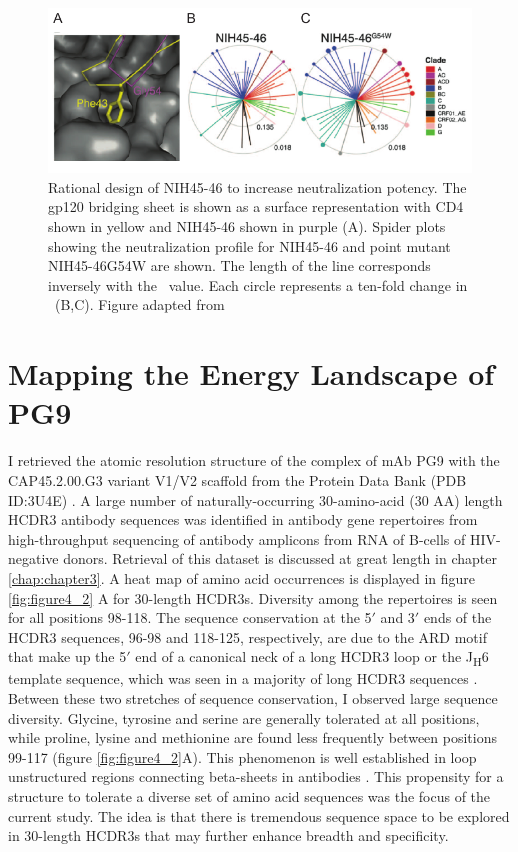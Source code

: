\begin{figure}
   \centering
   \includegraphics{images/chapter4/figure4_1.pdf} %
   \caption[Rational Design of NIH45-46 to Increase Neutralization Potency]{Rational design of NIH45-46 to increase neutralization potency. The gp120 bridging sheet is shown as a surface representation with CD4 shown in yellow and NIH45-46 shown in purple (A). Spider plots showing the neutralization profile for NIH45-46 and point mutant NIH45-46G54W are shown. The length of the line corresponds inversely with the \ic~value. Each circle represents a ten-fold change in \ic~(B,C). Figure adapted from \citep{Diskin:2011hl}}
   \label{fig:figure4_1}
\end{figure}

\section{Mapping the Energy Landscape of PG9}
\label{sec:mapping}
I retrieved the atomic resolution structure of the complex of mAb PG9 with the CAP45.2.00.G3 variant V1/V2 scaffold from the Protein Data Bank (PDB ID:3U4E) \citep{McLellan:2011dg}. A large number of naturally-occurring 30-amino-acid (30 AA) length HCDR3 antibody sequences was identified in antibody gene repertoires from high-throughput sequencing of antibody amplicons from RNA of B-cells of HIV-negative donors. Retrieval of this dataset is discussed at great length in chapter \ref{chap:chapter3}. A heat map of amino acid occurrences is displayed in figure \ref{fig:figure4_2} A for 30-length HCDR3s. Diversity among the repertoires is seen for all positions 98-118. The sequence conservation at the 5$'$ and 3$'$ ends of the HCDR3 sequences, 96-98 and 118-125, respectively, are due to the ARD motif that make up the 5$'$ end of a canonical neck of a long HCDR3 loop or the J\textsubscript{H}6 template sequence, which was seen in a majority of long HCDR3 sequences \citep{North:2011dv,Briney:2012ib}. Between these two stretches of sequence conservation, I observed large sequence diversity. Glycine, tyrosine and serine are generally tolerated at all positions, while proline, lysine and methionine are found less frequently between positions 99-117 (figure \ref{fig:figure4_2}A). This phenomenon is well established in loop unstructured regions connecting beta-sheets in antibodies \citep{Minuchehr:2005wc,De:2005in}.  This propensity for a structure to tolerate a diverse set of amino acid sequences was the focus of the current study. The idea is that there is tremendous sequence space to be explored in 30-length HCDR3s that may further enhance breadth and specificity.

